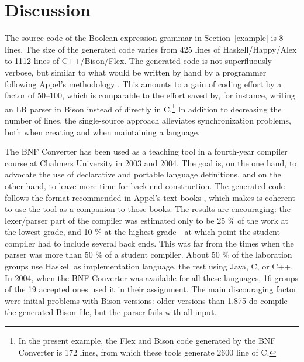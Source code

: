 \section{Discussion}


The source code of the Boolean expression grammar in Section~\ref{example} is
8 lines. The size of the generated code varies from 425 lines of 
Haskell/Happy/Alex to 
1112 lines of C++/Bison/Flex. The generated code is not superfluously verbose, but
similar to what would be written by hand by a programmer following
Appel's methodology \cite{AppelC,AppelJ,appel}. 
This amounts to a gain of coding effort by
a factor of 50--100, which is comparable to the effort saved by,
for instance, writing an LR parser in Bison instead of directly in C.\footnote{
In the present example, the Flex and Bison code generated by the BNF Converter 
is 172 lines, from which these tools generate 2600 line of C.
}
In addition to decreasing the number of lines, the single-source
approach alleviates synchronization problems, both when creating and 
when maintaining a language.




\label{results}

The BNF Converter has been used as a teaching tool in a
fourth-year compiler course at Chalmers University in 2003 and 2004.
The goal is, on the one hand, to advocate the use of declarative
and portable language definitions, and on the other hand, to
leave more time for back-end construction. The generated code
follows the format recommended in Appel's text books \cite{AppelC,AppelJ,appel},
which makes is coherent to use the tool as a companion to those books.
The results are encouraging: the lexer/parser part of the compiler 
was estimated only to be 25 \% of the work at the lowest grade, 
and 10 \% at the highest grade---at which point the student compiler had to 
include several back ends. This was far from the times 
when the parser was more than 50 \% of a student compiler.
About 50 \% of the laboration groups use Haskell as implementation
language, the rest using Java, C, or C++. 
In 2004, when the BNF Converter was available for all these languages,
16 groups of the 19 accepted ones used it in their assignment.
The main discouraging factor were initial problems with Bison
versions: older versions than 1.875 do compile the generated Bison file,
but the parser fails with all input.

